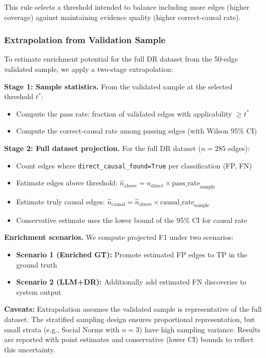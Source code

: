 This rule selects a threshold intended to balance including more edges (higher coverage) against maintaining evidence quality (higher correct-causal rate).

\subsubsection{Extrapolation from Validation Sample}
\label{sec:rq3_extrapolation}

To estimate enrichment potential for the full DR dataset from the 50-edge validated sample, we apply a two-stage extrapolation:

\textbf{Stage 1: Sample statistics.} From the validated sample at the selected threshold $t^*$:
\begin{itemize}[noitemsep]
    \item Compute the pass rate: fraction of validated edges with applicability $\geq t^*$
    \item Compute the correct-causal rate among passing edges (with Wilson 95\% CI)
\end{itemize}

\textbf{Stage 2: Full dataset projection.} For the full DR dataset ($n=285$ edges):
\begin{itemize}[noitemsep]
    \item Count edges where \texttt{direct\_causal\_found=True} per classification (FP, FN)
    \item Estimate edges above threshold: $\hat{n}_{\text{above}} = n_{\text{direct}} \times \text{pass\_rate}_{\text{sample}}$
    \item Estimate truly causal edges: $\hat{n}_{\text{causal}} = \hat{n}_{\text{above}} \times \text{causal\_rate}_{\text{sample}}$
    \item Conservative estimate uses the lower bound of the 95\% CI for causal rate
\end{itemize}

\textbf{Enrichment scenarios.} We compute projected F1 under two scenarios:
\begin{itemize}[noitemsep]
    \item \textbf{Scenario 1 (Enriched GT):} Promote estimated FP edges to TP in the ground truth
    \item \textbf{Scenario 2 (LLM+DR):} Additionally add estimated FN discoveries to system output
\end{itemize}

\textbf{Caveats:} Extrapolation assumes the validated sample is representative of the full dataset. The stratified sampling design ensures proportional representation, but small strata (e.g., Social Norms with $n=3$) have high sampling variance. Results are reported with point estimates and conservative (lower CI) bounds to reflect this uncertainty.

